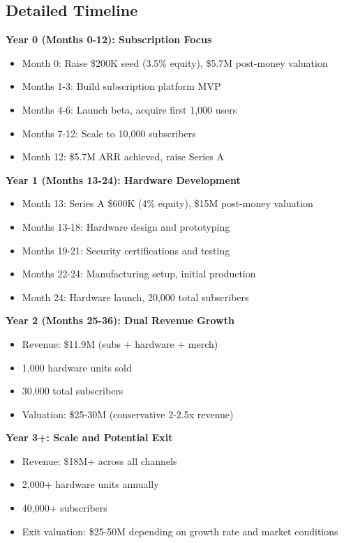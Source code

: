 \documentclass[11pt]{article}
\begin{document}
\subsection{Detailed Timeline}

\textbf{Year 0 (Months 0-12): Subscription Focus}
\begin{itemize}
  \item Month 0: Raise \$200K seed (3.5\% equity), \$5.7M post-money valuation
  \item Months 1-3: Build subscription platform MVP
  \item Months 4-6: Launch beta, acquire first 1,000 users
  \item Months 7-12: Scale to 10,000 subscribers
  \item Month 12: \$5.7M ARR achieved, raise Series A
\end{itemize}

\textbf{Year 1 (Months 13-24): Hardware Development}
\begin{itemize}
  \item Month 13: Series A \$600K (4\% equity), \$15M post-money valuation
  \item Months 13-18: Hardware design and prototyping
  \item Months 19-21: Security certifications and testing
  \item Months 22-24: Manufacturing setup, initial production
  \item Month 24: Hardware launch, 20,000 total subscribers
\end{itemize}

\textbf{Year 2 (Months 25-36): Dual Revenue Growth}
\begin{itemize}
  \item Revenue: \$11.9M (subs + hardware + merch)
  \item 1,000 hardware units sold
  \item 30,000 total subscribers
  \item Valuation: \$25-30M (conservative 2-2.5x revenue)
\end{itemize}

\textbf{Year 3+: Scale and Potential Exit}
\begin{itemize}
  \item Revenue: \$18M+ across all channels
  \item 2,000+ hardware units annually
  \item 40,000+ subscribers
  \item Exit valuation: \$25-50M depending on growth rate and market conditions
\end{itemize}
\end{document}
